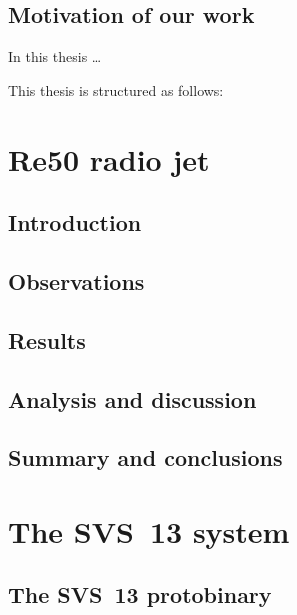 \documentclass[12pt]{mythesis}
\begin{document}
\section{Motivation of our work}

In this thesis \dots

\noindent
This thesis is structured as follows:

\chapter{Re50 radio jet}
\section{Introduction}
\section{Observations}
\section{Results}
\section{Analysis and discussion}
\section{Summary and conclusions}

\chapter{The SVS~13 system}
\section{The SVS~13 protobinary}
\end{document}
